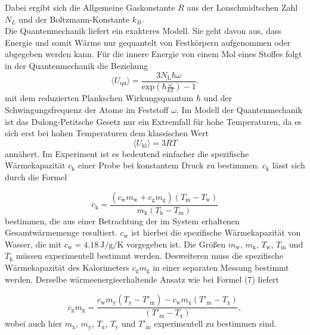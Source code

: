 \documentclass[
  bibliography=totoc,     %
  captions=tableheading,  %
  titlepage=firstiscover, %
]{scrartcl}
\begin{document}
Dabei ergibt sich die Allgemeine Gaskonstante $R$ aus der Lonschmidtschen Zahl $N_L$
und der Boltzmann-Konstante $k_B$.\\
Die Quantenmechanik liefert ein exakteres Modell. Sie geht davon aus, dass
Energie und somit Wärme nur gequantelt von Festkörpern aufgenommen oder
abgegeben werden kann. Für die innere Energie von einem Mol eines Stoffes folgt
in der Quantenmechanik die Beziehung
\begin{equation}
  \langle U_{\mathup{qu}}\rangle=\frac{3N_{\mathup{L}}\hbar\omega}{\mathup{exp}\left(\hbar\frac{\omega}{kT}\right)-1}.
  \label{eqn:Uqu}
\end{equation}
mit dem reduzierten Plankschen Wirkungsquantum $\hbar$ und der Schwingungsfrequenz der
Atome im Feststoff $\omega$. Im Modell der Quantenmechanik ist das Dulong-Petitsche
Gesetz nur ein Extremfall für hohe Temperaturen, da es sich erst bei hohen
Temperaturen dem klassischen Wert
\begin{equation}
  \langle U_{\mathup{kl}}\rangle=3RT
  \label{eqn:Ukl}
\end{equation}
annähert. Im Experiment ist es bedeutend einfacher die spezifische Wärmekapazität $c_{\mathup{k}}$ einer Probe bei
konstantem Druck zu bestimmen. $c_{\mathup{k}}$ lässt sich durch die Formel

\begin{equation}
  c_{\mathup{k}}=\frac{\left(c_{\mathup{w}}m_{\mathup{w}}+c_{\mathup{g}}m_{\mathup{g}}\right)\left(T_{\mathup{m}}-T_{\mathup{w}}\right)}{m_{\mathup{k}}\left(T_{\mathup{k}}-T_{\mathup{m}}\right)}
  \label{eqn:ck}
\end{equation}
bestimmen, die aus einer Betrachtung der im System erhaltenen Gesamtwärmemenge resultiert.
$c_{\mathup{w}}$ ist hierbei die spezifische Wärmekapazität von Wasser,
die mit $c_{\mathup{w}}=\SI{4.18}{\joule\per\gram\per\kelvin}$ vorgegeben ist.
Die Größen $m_{\mathup{w}}$, $m_{\mathup{k}}$, $T_{\mathup{w}}$, $T_{\mathup{m}}$ und $T_{\mathup{k}}$ müssen
experimentell bestimmt werden.
Desweiteren muss die spezifische Wärmekapazität des Kalorimeters $c_{\mathup{g}}m_{\mathup{g}}$ in einer
separaten Messung bestimmt werden. Derselbe wärmeenergieerhaltende Ansatz wie bei Formel (7) liefert

\begin{equation}
  c_{\mathup{g}}m_{\mathup{g}}=\frac{c_{\mathup{w}}m_{\mathup{y}}\left(T_{\mathup{y}}-T'_{\mathup{m}}\right)-c_{\mathup{w}}m_{\mathup{x}}\left(T'_{\mathup{m}}-T_{\mathup{x}}\right)}{\left(T'_{\mathup{m}}-T_{\mathup{x}}\right)},
  \label{eqn:cgmg}
\end{equation}
wobei auch hier $m_{\mathup{x}}$, $m_{\mathup{y}}$, $T_{\mathup{x}}$, $T_{\mathup{y}}$ und $T'_{\mathup{m}}$
experimentell zu bestimmen sind.
\clearpage
\end{document}
